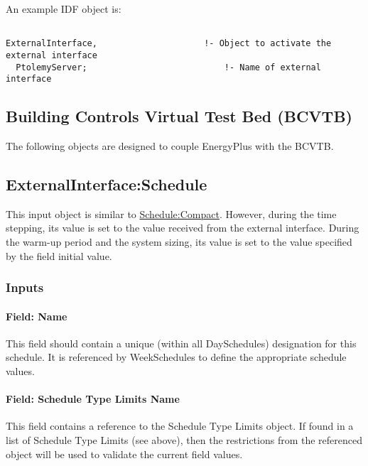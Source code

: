 An example IDF object is:

\begin{lstlisting}

ExternalInterface,                     !- Object to activate the external interface
  PtolemyServer;                           !- Name of external interface
\end{lstlisting}

\subsection{Building Controls Virtual Test Bed (BCVTB)}\label{building-controls-virtual-test-bed-bcvtb}

The following objects are designed to couple EnergyPlus with the BCVTB.

\subsection{ExternalInterface:Schedule}\label{externalinterfaceschedule}

This input object is similar to \hyperref[schedulecompact]{Schedule:Compact}. However, during the time stepping, its value is set to the value received from the external interface. During the warm-up period and the system sizing, its value is set to the value specified by the field initial value.

\subsubsection{Inputs}\label{inputs-1-016}

\paragraph{Field: Name}\label{field-name-1-015}

This field should contain a unique (within all DaySchedules) designation for this schedule. It is referenced by WeekSchedules to define the appropriate schedule values.

\paragraph{Field: Schedule Type Limits Name}\label{field-schedule-type-limits-name}

This field contains a reference to the Schedule Type Limits object. If found in a list of Schedule Type Limits (see above), then the restrictions from the referenced object will be used to validate the current field values.

